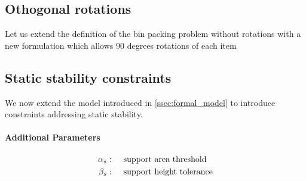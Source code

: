 \subsection*{Othogonal rotations}

Let us extend the definition of the bin packing problem without rotations with a new formulation which allows $90$ degrees rotations of each item 

\subsection*{Static stability constraints}

We now extend the model introduced in \cref{ssec:formal_model} to introduce constraints addressing static stability.

\paragraph*{Additional Parameters}
\begin{align*}
    \alpha_s  :\hspace{.5cm}& \text{support area threshold} \\
    \beta_s  :\hspace{.5cm}& \text{support height tolerance} 
\end{align*}